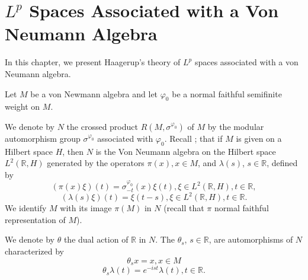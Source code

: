 
% 
\chapter{$L^p$ Spaces Associated with a Von Neumann Algebra}
In this chapter, we present Haagerup's theory of $L^p$ spaces associated with a von Neumann algebra.\par
Let $M$ be a von Newmann algebra and let $\varphi_0$ be a normal faithful semifinite weight on $M$.\par
We denote by $N$ the crossed product $R(M,\sigma^{\varphi_0})$ of $M$ by the modular automorphism group $\sigma^{\varphi_0}$ associated with $\varphi_0$. Recall \cite[Section 3]{18}; \cite[Section 5]{8} that if $M$ is given on a Hilbert space $H$, then $N$ is the Von Neumann algebra on the Hilbert space $L^2(\mathbb{R},H)$ generated by the operators $\pi(x),x\in M$, and $\lambda(s)$, $s\in \mathbb{R}$, defined by
\begin{equation}
    (\pi(x)\xi)(t)=\sigma_{-t}^{\varphi_0}(x)\xi(t),\xi\in L^2(\mathbb{R},H),t\in \mathbb{R},
\end{equation}
\begin{equation}
    (\lambda(s)\xi)(t)=\xi(t-s),\xi\in L^2(\mathbb{R},H),t\in \mathbb{R}.
\end{equation}
We identify $M$ with its image $\pi(M)$ in $N$ (recall that $\pi$ normal faithful representation of $M$).\par
We denote by $\theta$ the dual action of $\mathbb{R}$ in $N$. The $\theta_s$, $s\in \mathbb{R}$, are automorphisms of $N$ characterized by
\begin{equation}\label{Chap2: eqn: 3}
    \theta_s x=x, x\in M
\end{equation}
\begin{equation}
    \theta_s\lambda(t)=e^{-ist}\lambda(t),t\in \mathbb{R}.
\end{equation}
